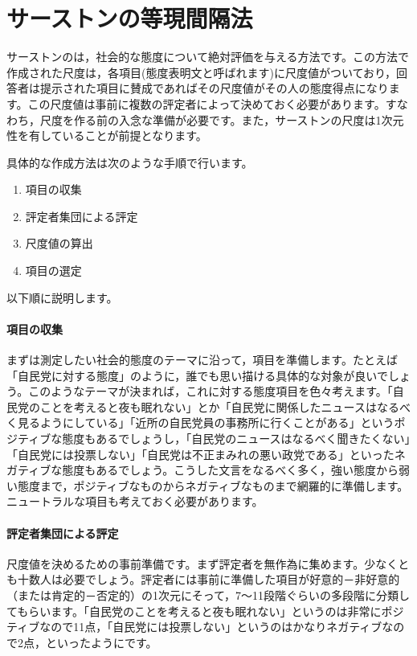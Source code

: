 \documentclass{ltjsbook}
\begin{document}
\section{サーストンの等現間隔法}
\label{ThurstoneScale}
サーストンのは，社会的な態度について絶対評価を与える方法です。この方法で作成された尺度は，各項目(態度表明文と呼ばれます)に尺度値がついており，回答者は提示された項目に賛成であればその尺度値がその人の態度得点になります。この尺度値は事前に複数の評定者によって決めておく必要があります。すなわち，尺度を作る前の入念な準備が必要です。また，サーストンの尺度は1次元性を有していることが前提となります。

具体的な作成方法は次のような手順で行います。
\begin{enumerate}
	\item 項目の収集
	\item 評定者集団による評定
	\item 尺度値の算出
	\item 項目の選定
\end{enumerate}

以下順に説明します。
\paragraph{項目の収集}まずは測定したい社会的態度のテーマに沿って，項目を準備します。たとえば「自民党に対する態度」のように，誰でも思い描ける具体的な対象が良いでしょう。このようなテーマが決まれば，これに対する態度項目を色々考えます。「自民党のことを考えると夜も眠れない」とか「自民党に関係したニュースはなるべく見るようにしている」「近所の自民党員の事務所に行くことがある」というポジティブな態度もあるでしょうし，「自民党のニュースはなるべく聞きたくない」「自民党には投票しない」「自民党は不正まみれの悪い政党である」といったネガティブな態度もあるでしょう。こうした文言をなるべく多く，強い態度から弱い態度まで，ポジティブなものからネガティブなものまで網羅的に準備します。ニュートラルな項目も考えておく必要があります。

\paragraph{評定者集団による評定}尺度値を決めるための事前準備です。まず評定者を無作為に集めます。少なくとも十数人は必要でしょう。評定者には事前に準備した項目が好意的－非好意的（または肯定的－否定的）の1次元にそって，7〜11段階ぐらいの多段階に分類してもらいます。「自民党のことを考えると夜も眠れない」というのは非常にポジティブなので11点，「自民党には投票しない」というのはかなりネガティブなので2点，といったようにです。
\end{document}
